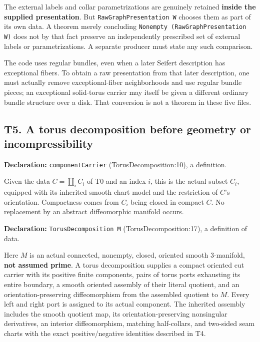 \documentclass[
  letterpaper,
  11pt]{article}
\begin{document}
The external labels and collar parametrizations are genuinely retained
\textbf{inside the supplied presentation}. But
{\small\texttt{Raw\allowbreak{}Graph\allowbreak{}Presentation W}}
chooses them as part of its own data. A theorem merely concluding
{\small\texttt{Nonempty (Raw\allowbreak{}Graph\allowbreak{}Presentation W)}}
does not by that fact preserve an independently prescribed set of
external labels or parametrizations. A separate producer must state any
such comparison.

The code uses regular bundles, even when a later Seifert description has
exceptional fibers. To obtain a raw presentation from that later
description, one must actually remove exceptional-fiber neighborhoods
and use regular bundle pieces; an exceptional solid-torus carrier may
itself be given a different ordinary bundle structure over a disk. That
conversion is not a theorem in these five files.

\subsection{T5. A torus decomposition before geometry or
incompressibility}\label{t5}

\textbf{Declaration:} {\small\texttt{component\allowbreak{}Carrier}}
(TorusDecomposition:10), a definition.

Given the data \(C=\coprod_i C_i\) of T0 and an index \(i\), this is the
actual subset \(C_i\), equipped with its inherited smooth chart model
and the restriction of \(C\)'s orientation. Compactness comes from
\(C_i\) being closed in compact \(C\). No replacement by an abstract
diffeomorphic manifold occurs.

\textbf{Declaration:} {\small\texttt{Torus\allowbreak{}Decomposition M}}
(TorusDecomposition:17), a definition of data.

Here \(M\) is an actual connected, nonempty, closed, oriented smooth
3-manifold, \textbf{not assumed prime}. A torus decomposition supplies a
compact oriented cut carrier with its positive finite components, pairs
of torus ports exhausting its entire boundary, a smooth oriented
assembly of their literal quotient, and an orientation-preserving
diffeomorphism from the assembled quotient to \(M\). Every left and
right port is assigned to its actual component. The inherited assembly
includes the smooth quotient map, its orientation-preserving nonsingular
derivatives, an interior diffeomorphism, matching half-collars, and
two-sided seam charts with the exact positive/negative identities
described in T4.
\end{document}
